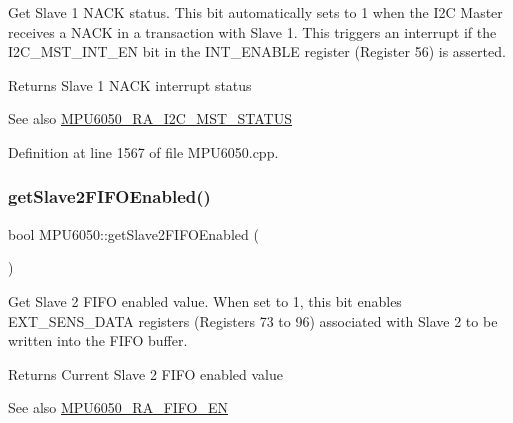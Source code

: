 Get Slave 1 N\+A\+CK status. This bit automatically sets to 1 when the I2C Master receives a N\+A\+CK in a transaction with Slave 1. This triggers an interrupt if the I2\+C\+\_\+\+M\+S\+T\+\_\+\+I\+N\+T\+\_\+\+EN bit in the I\+N\+T\+\_\+\+E\+N\+A\+B\+LE register (Register 56) is asserted. \begin{DoxyReturn}{Returns}
Slave 1 N\+A\+CK interrupt status 
\end{DoxyReturn}
\begin{DoxySeeAlso}{See also}
\mbox{\hyperlink{MPU6050_8h_a5ef54580f436c198fb84d01288fbef49}{M\+P\+U6050\+\_\+\+R\+A\+\_\+\+I2\+C\+\_\+\+M\+S\+T\+\_\+\+S\+T\+A\+T\+US}} 
\end{DoxySeeAlso}


Definition at line 1567 of file M\+P\+U6050.\+cpp.


\begin{DoxyCode}{0}

\end{DoxyCode}
\mbox{\label{classMPU6050_a3c2e29508607a655221a2fa4f4219b4d}} 
\subsubsection{\texorpdfstring{getSlave2FIFOEnabled()}{getSlave2FIFOEnabled()}}
{\footnotesize\ttfamily bool M\+P\+U6050\+::get\+Slave2\+F\+I\+F\+O\+Enabled (\begin{DoxyParamCaption}{ }\end{DoxyParamCaption})}

Get Slave 2 F\+I\+FO enabled value. When set to 1, this bit enables E\+X\+T\+\_\+\+S\+E\+N\+S\+\_\+\+D\+A\+TA registers (Registers 73 to 96) associated with Slave 2 to be written into the F\+I\+FO buffer. \begin{DoxyReturn}{Returns}
Current Slave 2 F\+I\+FO enabled value 
\end{DoxyReturn}
\begin{DoxySeeAlso}{See also}
\mbox{\hyperlink{MPU6050_8h_a1166fe50f4792f3266e15dc3273e375d}{M\+P\+U6050\+\_\+\+R\+A\+\_\+\+F\+I\+F\+O\+\_\+\+EN}} 
\end{DoxySeeAlso}


